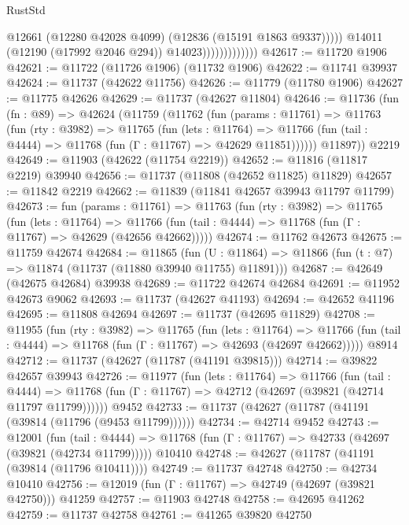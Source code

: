\begin{lexlean}{RustStd}
\begin{coremodule}
                                    @12661
                                    (@12280 @42028 @4099)
                                    (@12836 (@15191 @1863 @9337)))))
                              @14011
                              (@12190 (@17992 @2046 @294))
                              @14023)))))))))))))
@42617 := @11720 @1906
@42621 := @11722 (@11726 @1906) (@11732 @1906)
@42622 := @11741 @39937
@42624 := @11737 (@42622 @11756)
@42626 := @11779 (@11780 @1906)
@42627 := @11775 @42626
@42629 := @11737 (@42627 @11804)
@42646 := @11736
    (fun (fn : @89) =>
    @42624
      (@11759
        (@11762
          (fun (params : @11761) =>
          @11763
            (fun (rty : @3982) =>
            @11765
              (fun (lets : @11764) =>
              @11766 (fun (tail : @4444) => @11768 (fun (Γ : @11767) => @42629 @11851))))))
        @11897))
    @2219
@42649 := @11903 (@42622 (@11754 @2219))
@42652 := @11816 (@11817 @2219) @39940
@42656 := @11737 (@11808 (@42652 @11825) @11829)
@42657 := @11842 @2219
@42662 := @11839 (@11841 @42657 @39943 @11797 @11799)
@42673 := fun (params : @11761) =>
  @11763
    (fun (rty : @3982) =>
    @11765
      (fun (lets : @11764) =>
      @11766 (fun (tail : @4444) => @11768 (fun (Γ : @11767) => @42629 (@42656 @42662)))))
@42674 := @11762 @42673
@42675 := @11759 @42674
@42684 := @11865
    (fun (U : @11864) => @11866 (fun (t : @7) => @11874 (@11737 (@11880 @39940 @11755) @11891)))
@42687 := @42649 (@42675 @42684) @39938
@42689 := @11722 @42674 @42684
@42691 := @11952 @42673 @9062
@42693 := @11737 (@42627 @41193)
@42694 := @42652 @41196
@42695 := @11808 @42694
@42697 := @11737 (@42695 @11829)
@42708 := @11955
    (fun (rty : @3982) =>
    @11765
      (fun (lets : @11764) =>
      @11766 (fun (tail : @4444) => @11768 (fun (Γ : @11767) => @42693 (@42697 @42662)))))
    @8914
@42712 := @11737 (@42627 (@11787 (@41191 @39815)))
@42714 := @39822 @42657 @39943
@42726 := @11977
    (fun (lets : @11764) =>
    @11766
      (fun (tail : @4444) =>
      @11768 (fun (Γ : @11767) => @42712 (@42697 (@39821 (@42714 @11797 @11799))))))
    @9452
@42733 := @11737 (@42627 (@11787 (@41191 (@39814 (@11796 (@9453 @11799))))))
@42734 := @42714 @9452
@42743 := @12001
    (fun (tail : @4444) => @11768 (fun (Γ : @11767) => @42733 (@42697 (@39821 (@42734 @11799)))))
    @10410
@42748 := @42627 (@11787 (@41191 (@39814 (@11796 @10411))))
@42749 := @11737 @42748
@42750 := @42734 @10410
@42756 := @12019 (fun (Γ : @11767) => @42749 (@42697 (@39821 @42750))) @41259
@42757 := @11903 @42748
@42758 := @42695 @41262
@42759 := @11737 @42758
@42761 := @41265 @39820 @42750

\end{coremodule}
\end{lexlean}
